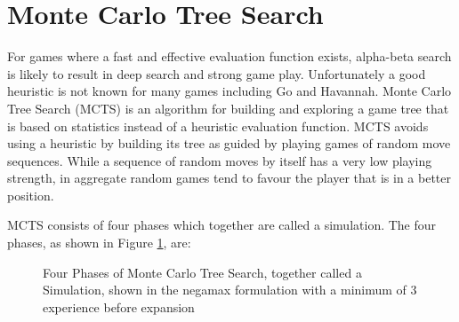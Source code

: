 






\section{Monte Carlo Tree Search}

For games where a fast and effective evaluation function exists, alpha-beta search is likely to result in deep search and strong game play. Unfortunately  a good heuristic is not known for many games including Go and Havannah. Monte Carlo Tree Search (MCTS) is an algorithm for building and exploring a game tree that is based on statistics instead of a heuristic evaluation function. MCTS avoids using a heuristic by building its tree as guided by playing games of random move sequences. While a sequence of random moves by itself has a very low playing strength, in aggregate random games tend to favour the player that is in a better position.

MCTS consists of four phases which together are called a simulation. The four phases, as shown in Figure \ref{fig:mcts}, are:

\begin{figure}
	\centering



\caption[Four Phases of Monte Carlo Tree Search]{Four Phases of Monte Carlo Tree Search, together called a Simulation, shown in the negamax formulation with a minimum of 3 experience before expansion}
\label{fig:mcts}
\end{figure}

